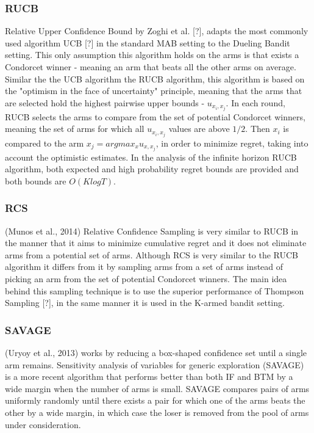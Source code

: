 \documentclass{llncs}
\begin{document}
	

\newpage

\subsubsection{RUCB} Relative Upper Confidence Bound by Zoghi et al. [?], adapts the most commonly used algorithm UCB [?] in the standard MAB setting to the Dueling Bandit setting. 
	This only assumption this algorithm holds on the arms is that exists a Condorcet winner - meaning an arm that beats all the other arms on average. 
	Similar the the UCB algorithm the RUCB algorithm, this algorithm is based on the "optimism in the face of uncertainty" principle, meaning that the arms that are selected hold the highest pairwise upper bounds - $u_{x_i,x_j}$.
	In each round, RUCB selects the arms to compare from the set of potential Condorcet winners, meaning the set of arms for which all $u_{x_i,x_j}$ values are above $1/2$.
	Then $x_i$ is compared to the arm $x_j = argmax_{x} u_{x,x_j}$, in order to minimize regret, taking into account the optimistic estimates. 
	In the analysis of the infinite horizon RUCB algorithm, both expected and high probability regret bounds are provided and both bounds are $O(K log T)$.  
	
	
	\newpage
\subsubsection{RCS}
	(Munos et al., 2014) Relative Confidence Sampling is very similar to RUCB in the manner that it aims to minimize cumulative regret and it does not eliminate arms from a potential set of arms.
	Although RCS is very similar to the RUCB algorithm it differs from it by sampling arms from a set of arms instead of picking an arm from the set of potential Condorcet winners.  
	The main idea behind this sampling technique is to use the superior performance of Thompson Sampling [?], in the same manner it is used in the K-armed bandit setting. 

	
	
\subsubsection{SAVAGE}
	(Uryoy et al., 2013) works by reducing a box-shaped confidence set until a single arm remains.
	Sensitivity analysis of variables for generic exploration (SAVAGE) is a more recent algorithm that performs better than both IF and BTM by a wide margin when the number of arms is small. 
	SAVAGE compares pairs of arms uniformly randomly until there exists a pair for which one of the arms beats the other by a wide margin, in which case the loser is removed from the pool of arms under consideration.

\end{document}
